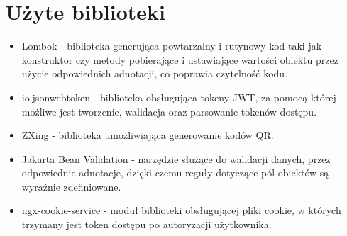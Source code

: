 \section{Użyte biblioteki}
\begin{itemize}
\item Lombok - biblioteka generująca powtarzalny i rutynowy kod taki jak konstruktor czy metody pobierające i ustawiające wartości obiektu przez użycie odpowiednich adnotacji, co poprawia czytelność kodu. 

\item io.jsonwebtoken - biblioteka obsługująca tokeny JWT, za pomocą której możliwe jest tworzenie, walidacja oraz parsowanie tokenów dostępu.

\item ZXing - biblioteka umożliwiająca generowanie kodów QR.

\item Jakarta Bean Validation - narzędzie służące do walidacji danych, przez odpowiednie adnotacje, dzięki czemu reguły dotyczące pól obiektów są wyraźnie zdefiniowane.

\item ngx-cookie-service - moduł biblioteki obsługującej pliki cookie, w których trzymany jest token dostępu po autoryzacji użytkownika.
\end{itemize}

